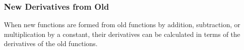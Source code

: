 \begin{frame}
\frametitle{New Derivatives from Old}
When new functions are formed from old functions by addition, subtraction, or multiplication by a constant, their derivatives can be calculated in terms of the derivatives of the old functions.
\end{frame}

